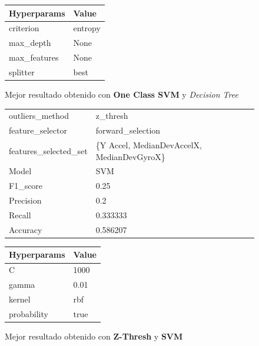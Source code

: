 \begin{appendices}
\begin{figure}[htb]
			\begin{tabular}{ll}
				\toprule
				 Hyperparams &   Value \\
				\midrule
				   criterion & entropy \\
				   max\_depth &    None \\
				max\_features &    None \\
					splitter &    best \\
				\bottomrule
			\end{tabular}
			\caption{Mejor resultado obtenido con \textbf{One Class SVM} y \emph{Decision Tree}}
			\label{table:16}
		\end{figure}

		\begin{figure}[htb]
			\centering
			\begin{tabular}{ll}
				\toprule
					  outliers\_method &                                   z\_thresh \\
					 feature\_selector &                          forward\_selection \\
				features\_selected\_set & \{Y Accel, MedianDevAccelX, MedianDevGyroX\} \\
								Model &                                        SVM \\
						F1\_score &                                       0.25 \\
					   Precision &                                        0.2 \\
						  Recall &                                   0.333333 \\
						Accuracy &                                   0.586207 \\
				\bottomrule
			\end{tabular}
			\newline
			\newline

			\begin{tabular}{ll}
				\toprule
				Hyperparams & Value \\
				\midrule
						  C &  1000 \\
					  gamma &  0.01 \\
					 kernel &   rbf \\
				probability &  true \\
				\bottomrule
			\end{tabular}
			\caption{Mejor resultado obtenido con \textbf{Z-Thresh} y \textbf{SVM}}
			\label{table:17}
		\end{figure}


\end{appendices}
